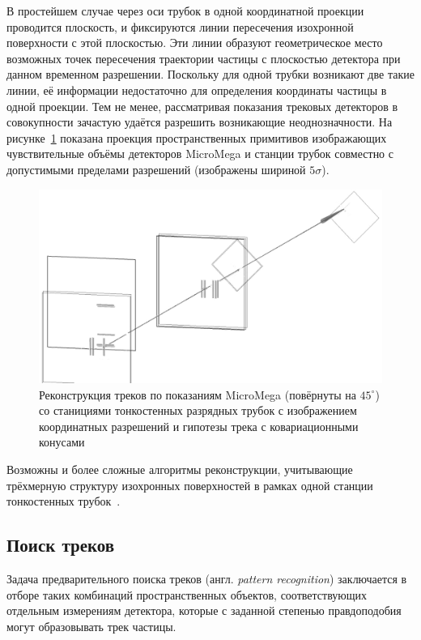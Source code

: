 В простейшем случае через оси трубок в одной координатной проекции
проводится плоскость, и фиксируются линии пересечения изохронной
поверхности с этой плоскостью. Эти линии образуют геометрическое
место возможных точек пересечения траектории частицы с плоскостью
детектора при данном временном разрешении. Поскольку для одной трубки
возникают две такие линии, её информации недостаточно для определения
координаты частицы в одной проекции. Тем не менее, рассматривая показания
трековых детекторов в совокупности зачастую удаётся разрешить
возникающие неоднозначности. На рисунке~\ref{fig:evdisplay-new}
показана проекция пространственных примитивов изображающих
чувствительные объёмы детекторов MicroMega и станции трубок
совместно с допустимыми пределами разрешений (изображены
шириной $5\sigma$).

\begin{figure}[ht]
    \centering
    \includegraphics[width=0.5\linewidth]{images//illustrative/ST-evdisp-mono.png}
    \caption{Реконструкция треков по показаниям MicroMega (повёрнуты на $45^{\circ}$)
    со станициями тонкостенных разрядных трубок с изображением
    координатных разрешений и гипотезы трека с ковариационными конусами}
    \label{fig:evdisplay-new}
\end{figure}


Возможны и более сложные алгоритмы реконструкции, учитывающие
трёхмерную структуру изохронных поверхностей в рамках одной станции
тонкостенных трубок~\cite{straws-peshekhonov2015}.

\subsection{Поиск треков}

Задача предварительного поиска треков (англ. \emph{pattern recognition})
заключается в отборе таких комбинаций пространственных объектов,
соответствующих отдельным измерениям детектора, которые с заданной
степенью правдоподобия могут образовывать трек частицы.

